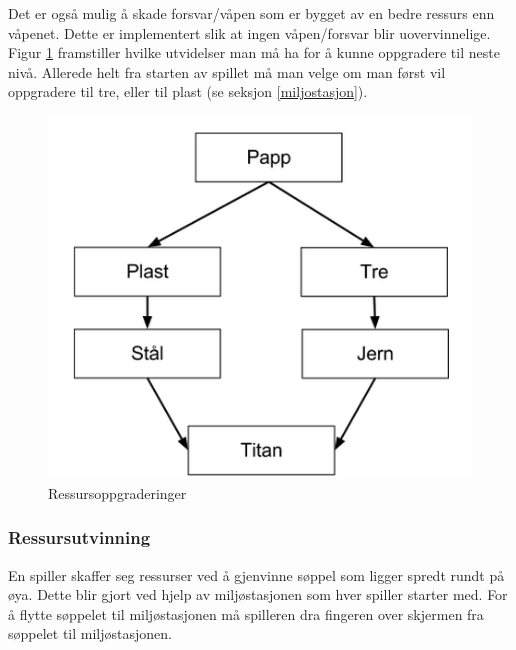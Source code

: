 Det er også mulig å skade forsvar/våpen som er bygget av en bedre ressurs enn våpenet. Dette er implementert slik at ingen våpen/forsvar blir uovervinnelige. Figur \ref{fig:ressursoppgraderinger} framstiller hvilke utvidelser man må ha for å kunne oppgradere til neste nivå. Allerede helt fra starten av spillet må man velge om man først vil oppgradere til tre, eller til plast (se seksjon \ref{miljostasjon}). 

	\begin{figure} [H]
				\begin{center}
					\includegraphics[scale=0.5]{images/oppgraderingstre}
				\end{center}
			\caption{Ressursoppgraderinger}
			\label{fig:ressursoppgraderinger}
	\end{figure}

\subsubsection{Ressursutvinning}
En spiller skaffer seg ressurser ved å gjenvinne søppel som ligger
spredt rundt på øya. Dette blir gjort ved hjelp av miljøstasjonen
som hver spiller starter med. For å flytte søppelet til miljøstasjonen må spilleren dra fingeren over skjermen fra søppelet til miljøstasjonen.
